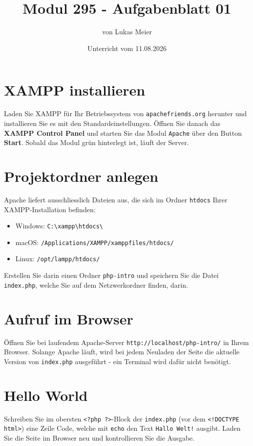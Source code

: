 \documentclass[a4paper,12pt]{article}
\title{Modul 295 - Aufgabenblatt 01}
\author{von Lukas Meier}
\date{Unterricht vom 11.08.2026}
\begin{document}
\maketitle

\section{XAMPP installieren}

Laden Sie XAMPP für Ihr Betriebssystem von \texttt{apachefriends.org} herunter und installieren Sie es mit den Standardeinstellungen. Öffnen Sie danach das \textbf{XAMPP Control Panel} und starten Sie das Modul \texttt{Apache} über den Button \textbf{Start}. Sobald das Modul grün hinterlegt ist, läuft der Server.

\section{Projektordner anlegen}

Apache liefert ausschliesslich Dateien aus, die sich im Ordner \texttt{htdocs} Ihrer XAMPP-Installation befinden:

\begin{itemize}
    \item Windows: \texttt{C:\textbackslash xampp\textbackslash htdocs\textbackslash}
    \item macOS: \texttt{/Applications/XAMPP/xamppfiles/htdocs/}
    \item Linux: \texttt{/opt/lampp/htdocs/}
\end{itemize}

Erstellen Sie darin einen Ordner \texttt{php-intro} und speichern Sie die Datei \texttt{index.php}, welche Sie auf dem Netzwerkordner finden, darin.

\section{Aufruf im Browser}

Öffnen Sie bei laufendem Apache-Server \texttt{http://localhost/php-intro/} in Ihrem Browser. Solange Apache läuft, wird bei jedem Neuladen der Seite die aktuelle Version von \texttt{index.php} ausgeführt - ein Terminal wird dafür nicht benötigt.

\section{Hello World}

Schreiben Sie im obersten \texttt{<?php ?>}-Block der \texttt{index.php} (vor dem \texttt{<!DOCTYPE html>}) eine Zeile Code, welche mit \texttt{echo} den Text \texttt{Hallo Welt!} ausgibt. Laden Sie die Seite im Browser neu und kontrollieren Sie die Ausgabe.
\end{document}
